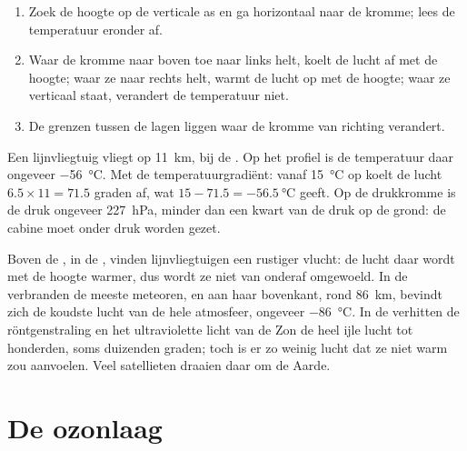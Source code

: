 \begin{method}\label{met:g8:the-atmosphere:profile}
\begin{enumerate}
  \item Zoek de hoogte op de verticale as en ga horizontaal naar de
        kromme; lees de temperatuur eronder af.
  \item Waar de kromme naar boven toe naar links helt, koelt de lucht af
        met de hoogte; waar ze naar rechts helt, warmt de lucht op met de
        hoogte; waar ze verticaal staat, verandert de temperatuur niet.
  \item De grenzen tussen de lagen liggen waar de kromme van richting
        verandert.
\end{enumerate}
\end{method}

\begin{example}\label{ex:g8:the-atmosphere:airliner}
Een lijnvliegtuig vliegt op \qty{11}{km}, bij de . Op het profiel
is de temperatuur daar ongeveer \qty{-56}{\degreeCelsius}. Met de
temperatuurgradiënt: vanaf \qty{15}{\degreeCelsius} op  koelt de
lucht $6.5 \times 11 = 71.5$ graden af, wat $15 - 71.5 =
\qty{-56.5}{\degreeCelsius}$ geeft. Op de drukkromme is de druk ongeveer
\qty{227}{hPa}, minder dan een kwart van de druk op de grond: de cabine moet
onder druk worden gezet.
\end{example}

Boven de , in de , vinden lijnvliegtuigen een rustiger
vlucht: de lucht daar wordt met de hoogte warmer, dus wordt ze niet van
onderaf omgewoeld. In de  verbranden de meeste meteoren, en aan
haar bovenkant, rond \qty{86}{km}, bevindt zich de koudste lucht van de hele
atmosfeer, ongeveer \qty{-86}{\degreeCelsius}. In de  verhitten
de röntgenstraling en het ultraviolette licht van de Zon de heel ijle lucht
tot honderden, soms duizenden graden; toch is er zo weinig lucht dat ze
niet warm zou aanvoelen. Veel satellieten draaien daar om de Aarde.

\section{De ozonlaag}

